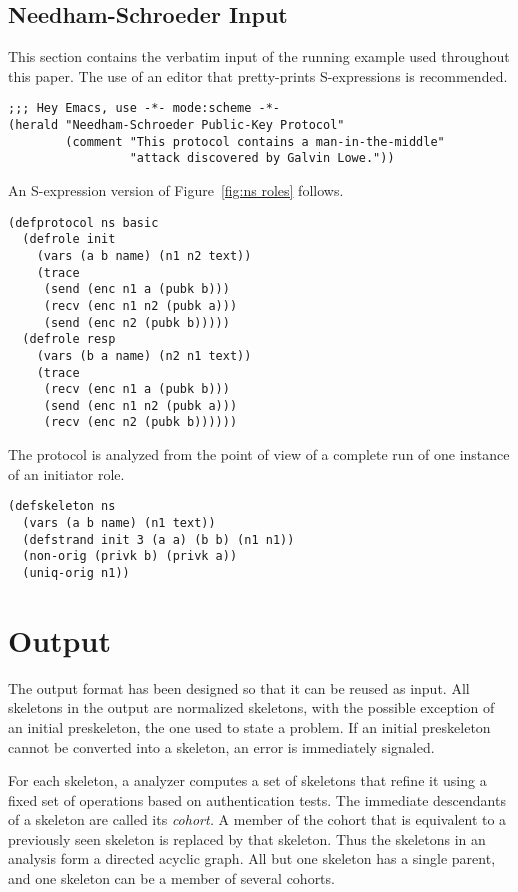 \documentclass[12pt]{article}
\begin{document}
\subsection{Needham-Schroeder Input}

\begin{sloppypar}
This section contains the verbatim input of the running example used
throughout this paper.  The use of an editor that pretty-prints
S-expressions is recommended.
\end{sloppypar}

\begin{verbatim}
;;; Hey Emacs, use -*- mode:scheme -*-
(herald "Needham-Schroeder Public-Key Protocol"
        (comment "This protocol contains a man-in-the-middle"
                 "attack discovered by Galvin Lowe."))
\end{verbatim}

An S-expression version of Figure~\ref{fig:ns roles} follows.

\begin{verbatim}
(defprotocol ns basic
  (defrole init
    (vars (a b name) (n1 n2 text))
    (trace
     (send (enc n1 a (pubk b)))
     (recv (enc n1 n2 (pubk a)))
     (send (enc n2 (pubk b)))))
  (defrole resp
    (vars (b a name) (n2 n1 text))
    (trace
     (recv (enc n1 a (pubk b)))
     (send (enc n1 n2 (pubk a)))
     (recv (enc n2 (pubk b))))))
\end{verbatim}

The protocol is analyzed from the point of view of a complete run of
one instance of an initiator role.

\begin{verbatim}
(defskeleton ns
  (vars (a b name) (n1 text))
  (defstrand init 3 (a a) (b b) (n1 n1))
  (non-orig (privk b) (privk a))
  (uniq-orig n1))
\end{verbatim}

\section{Output}\label{sec:output}

The {\cpsa} output format has been designed so that it can be reused
as input.  All skeletons in the output are normalized skeletons,
with the possible exception of an initial preskeleton, the one used to
state a problem.  If an initial preskeleton cannot be converted into a
skeleton, an error is immediately signaled.

For each skeleton, a {\cpsa} analyzer computes a set of skeletons that
refine it using a fixed set of operations based on authentication
tests.  The immediate descendants of a skeleton are called its
\emph{cohort.}  A member of the cohort that is
equivalent to a previously seen skeleton is replaced by that skeleton.
Thus the skeletons in an analysis form a directed acyclic graph.  All
but one skeleton has a single parent, and one skeleton can be a member
of several cohorts.
\end{document}
